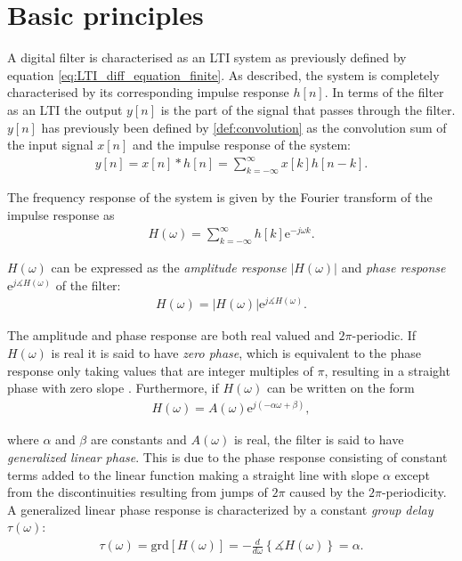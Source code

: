 \section{Basic principles} \label{sec:basic_filter}
A digital filter is characterised as an LTI system as previously defined by equation \eqref{eq:LTI_diff_equation_finite}. As described, the system is completely characterised by its corresponding impulse response $h[n]$. In terms of the filter as an LTI the output $y[n]$ is the part of the signal that passes through the filter. \\
$y[n]$ has previously been defined by \eqref{def:convolution} as the convolution sum of the input signal $x[n]$ and the impulse response of the system:
\begin{align*}
y[n] = x[n]*h[n] = \sum_{k=-\infty}^{\infty} x[k]h[n-k].
\end{align*}

The frequency response of the system is given by the Fourier transform of the impulse response as
\begin{align} \label{eq:freq_res}
H(\omega) = \sum_{k=-\infty}^{\infty} h[k] \text{e}^{-j\omega k}.
\end{align}

$H(\omega)$ can be expressed as the \textit{amplitude response} $|H(\omega)|$ and \textit{phase response} $\text{e}^{j\measuredangle H(\omega)}$ of the filter:
\begin{align*}
H(\omega) = |H(\omega)| \text{e}^{j\measuredangle H(\omega)}.
\end{align*}

The amplitude and phase response are both real valued and $2\pi$-periodic. If $H(\omega)$ is real it is said to have \textit{zero phase}, which is equivalent to the phase response only taking values that are integer multiples of $\pi$, resulting in a straight phase with zero slope \cite{page 227, FSP}. Furthermore, if $H(\omega)$ can be written on the form
\begin{align} \label{eq:lin_pha}
H(\omega) = A(\omega) \text{e}^{j(-\alpha\omega + \beta)},
\end{align}

where $\alpha$ and $\beta$ are constants and $A(\omega)$ is real, the filter is said to have \textit{generalized linear phase}. This is due to the phase response consisting of constant terms added to the linear function making a straight line with slope $\alpha$ except from the discontinuities resulting from jumps of $2\pi$ caused by the $2\pi$-periodicity. \\
A generalized linear phase response is characterized by a constant \textit{group delay} $\tau(\omega)$:
\begin{align*}
\tau(\omega) = \text{grd}[H(\omega)] = -\frac{d}{d\omega} \left\{ \measuredangle H(\omega) \right\} = \alpha.
\end{align*}

